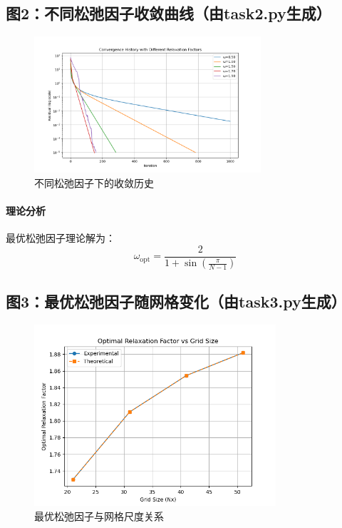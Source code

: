 \documentclass[UTF8]{ctexart}
\begin{document}
\subsection{图2：不同松弛因子收敛曲线（由task2.py生成）}
\begin{figure}[h]
    \centering
    \includegraphics[width=0.75\textwidth]{Figure_2.png}
    \caption{不同松弛因子下的收敛历史}
    \label{fig:converge}
\end{figure}


\paragraph{理论分析}
最优松弛因子理论解为：
\begin{equation}
    \omega_{\mathrm{opt}} = \frac{2}{1 + \sin\left(\frac{\pi}{N-1}\right)}
\end{equation}

\subsection{图3：最优松弛因子随网格变化（由task3.py生成）}
\begin{figure}[h]
    \centering
    \includegraphics[width=0.8\textwidth]{Figure_3.png}
    \caption{最优松弛因子与网格尺度关系}
    \label{fig:omega_grid}
\end{figure}
\end{document}
